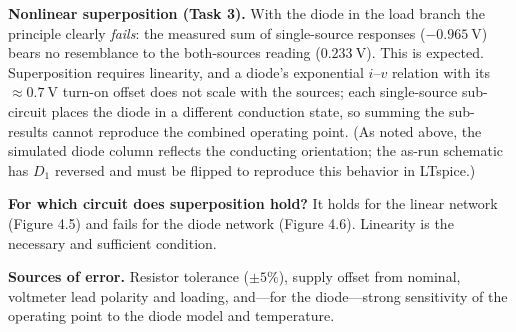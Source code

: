 \documentclass[11pt]{article}
\begin{document}
\textbf{Nonlinear superposition (Task 3).} With the diode in the load branch the
principle clearly \emph{fails}: the measured sum of single-source responses
($\SI{-0.965}{\volt}$) bears no resemblance to the both-sources reading
($\SI{0.233}{\volt}$). This is expected. Superposition requires linearity, and a
diode's exponential $i$--$v$ relation with its $\approx\SI{0.7}{\volt}$ turn-on
offset does not scale with the sources; each single-source sub-circuit places the
diode in a different conduction state, so summing the sub-results cannot reproduce
the combined operating point. (As noted above, the simulated diode column reflects
the conducting orientation; the as-run schematic has $D_1$ reversed and must be
flipped to reproduce this behavior in LTspice.)

\textbf{For which circuit does superposition hold?} It holds for the linear
network (Figure 4.5) and fails for the diode network (Figure 4.6). Linearity is
the necessary and sufficient condition.

\textbf{Sources of error.} Resistor tolerance ($\pm5\%$), supply offset from
nominal, voltmeter lead polarity and loading, and---for the diode---strong
sensitivity of the operating point to the diode model and temperature.

\end{document}
